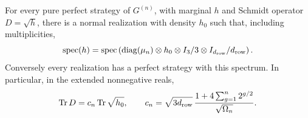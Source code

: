 \begin{lemma}\label{lem:spectrum}
For every pure perfect strategy of $G^{(n)}$, with marginal $h$ and Schmidt operator $D=\sqrt h$, there is a normal realization with density $h_0$ such that, including multiplicities,
\begin{equation}\label{eq:specidentity}
 \operatorname{spec}(h)=\operatorname{spec}\left(\operatorname{diag}(\mu_n)\otimes h_0
                    \otimes I_3/3\otimes I_{d_{\mathrm{row}}}/d_{\mathrm{row}}\right).
\end{equation}
Conversely every realization has a perfect strategy with this spectrum. In particular, in the extended nonnegative reals,
\begin{equation}\label{eq:traceidentity}
 \operatorname{Tr} D=c_n\operatorname{Tr}\sqrt{h_0},\qquad
 c_n=\sqrt{3d_{\mathrm{row}}}\,\frac{1+4\sum_{g=1}^n2^{g/2}}{\sqrt{\Omega_n}}.
\end{equation}
\end{lemma}
